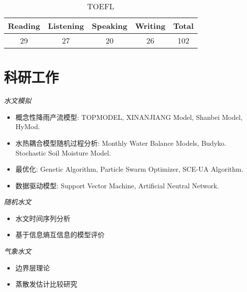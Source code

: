 \documentclass[margin]{res}
\begin{document}
\begin{CJK}{UTF8}{gkai}
\begin{resume}
\begin{minipage}{0.42\linewidth}
\end{minipage}
\hfill
\begin{minipage}{.64\linewidth}
\begin{table}[H]\footnotesize
\begin{center}
\caption*{TOEFL}
\begin{tabular}{ccccc}
\toprule
Reading & Listening  &  Speaking & Writing & Total \\ 
\midrule
29 & 27 & 20 & 26 & 102 \\  
\bottomrule
\end{tabular}
\end{center}
\end{table} 
 
\end{minipage}
  

                

\section{科研工作} {\sl 水文模拟}   \\
                 \begin{itemize}  \itemsep -2pt %
                 \item 概念性降雨产流模型: TOPMODEL, XINANJIANG Model, Shanbei Model, HyMod.
                \item  水热耦合模型随机过程分析: Monthly Water Balance Models, Budyko. Stochastic Soil Moisture Model.
                \item  最优化: Genetic Algorithm, Particle Swarm Optimizer, SCE-UA Algorithm. 
                \item 数据驱动模型: Support Vector Machine, Artificial Neutral Network.
                \end{itemize}
 
                {\sl 随机水文}  \\
                 \begin{itemize}  \itemsep -2pt %
                 \item 水文时间序列分析
                 \item 基于信息熵互信息的模型评价
                 
                 \end{itemize} 
                 {\sl 气象水文}  \\
                 \begin{itemize}  \itemsep -2pt %
                 \item 边界层理论
                 \item 蒸散发估计比较研究 
                 

\end{itemize}
\end{resume}
\end{CJK}
\end{document}
